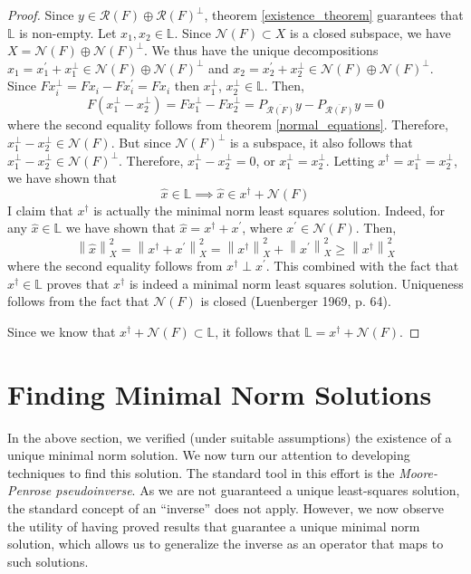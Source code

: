 \documentclass[12pt]{article}
\newcommand*{\norm}[1]{\left\lVert#1\right\rVert}
\newcommand{\R}{\mathcal{R}}
\newcommand{\N}{\mathcal{N}}
\begin{document}
\begin{proof} 
Since $y \in \R(F) \oplus \R(F)^\perp$, theorem \ref{existence_theorem} guarantees that $\mathbb{L}$ is non-empty. Let $x_1, x_2 \in \mathbb{L}$. 
Since $\N(F) \subset X$ is a closed subspace, we have $X = \N(F) \oplus \N(F)^\perp$. We thus have the unique decompositions
$x_1 = x_1^\prime + x_1^\perp \in \N(F) \oplus \N(F)^\perp$ and $x_2 = x_2^\prime + x_2^\perp \in \N(F) \oplus \N(F)^\perp$. Since 
$Fx_i^\perp = Fx_i - Fx_i^\prime = Fx_i$ then $x_1^\perp$, $x_2^\perp \in \mathbb{L}$. Then, 
\[F(x_1^\perp - x_2^\perp) = Fx_1^\perp - Fx_2^\perp = P_{\overline{\R(F)}}y - P_{\overline{\R(F)}}y = 0\]
where the second equality follows from theorem \ref{normal_equations}. Therefore, $x_1^\perp - x_2^\perp \in \N(F)$. 
But since $\N(F)^\perp$ is a subspace, it also follows that $x_1^\perp - x_2^\perp \in \N(F)^\perp$. Therefore, 
$x_1^\perp - x_2^\perp = 0$, or $x_1^\perp = x_2^\perp$. Letting $x^\dagger = x_1^\perp = x_2^\perp$, we have shown that
\[\hat{x} \in \mathbb{L} \implies \hat{x} \in x^\dagger + \N(F)\]
I claim that $x^\dagger$ is actually the minimal norm least squares solution. Indeed, for any $\hat{x} \in \mathbb{L}$ we have
shown that $\hat{x} = x^\dagger + x^\prime$, where $x^\prime \in \N(F)$. Then, 
\[\norm{\hat{x}}_X^2 = \norm{x^\dagger + x^\prime}_X^2 = \norm{x^\dagger}_X^2 + \norm{x^\prime}_X^2 \geq \norm{x^\dagger}_X^2\]
where the second equality follows from $x^\dagger \perp x^\prime$. This combined with the fact that $x^\dagger \in \mathbb{L}$ proves that
$x^\dagger$ is indeed a minimal norm least squares solution. Uniqueness follows from the fact that $\N(F)$ is closed (Luenberger 1969, p. 64). 

Since we know that $x^\dagger + \N(F) \subset \mathbb{L}$, it follows that $\mathbb{L} = x^\dagger + \N(F)$. 
\end{proof} 

\section{Finding Minimal Norm Solutions}
 
In the above section, we verified (under suitable assumptions) the existence of a unique minimal norm solution. 
We now turn our attention to developing techniques to find this solution. The standard tool in this effort is the 
\textit{Moore-Penrose pseudoinverse}. As we are not guaranteed a unique least-squares solution, 
the standard concept of an ``inverse'' does not apply. However, we now observe the utility of having 
proved results that guarantee a unique minimal norm solution, which allows us to generalize the 
inverse as an operator that maps to such solutions. 
 
\end{document}

